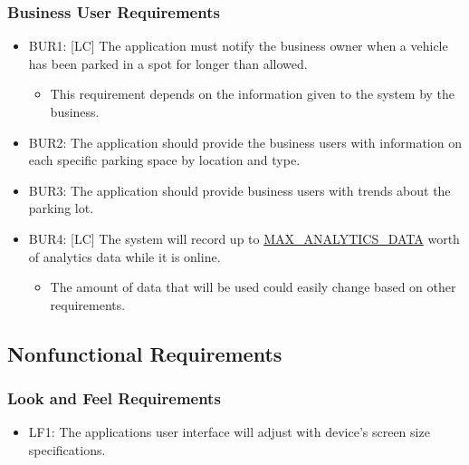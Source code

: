 \documentclass[]{article}
\begin{document}
\subsubsection{Business User Requirements}
\begin{itemize}
	\item BUR1: [LC] The application must notify the business owner when a vehicle has been parked in a spot for longer than allowed.
	\begin{itemize}
		\item This requirement depends on the information given to the system by the business.
	\end{itemize}
	\item BUR2:  The application should provide the business users with information on each specific parking space by location and type.
	\item BUR3: The application should provide business users with trends about the parking lot.
	\item BUR4: [LC] The system will record up to \hyperlink{ANALYTICSDATA}{MAX\_ANALYTICS\_DATA} worth of analytics data while it is online.
	\begin{itemize}
		\item The amount of data that will be used could easily change based on other requirements.
	\end{itemize}
\end{itemize}

	
	

	
\subsection{Nonfunctional Requirements}
\subsubsection{Look and Feel Requirements}
\begin{itemize}
	\item LF1: The applications user interface will adjust with device’s screen size specifications.
\end{itemize}
\end{document}
